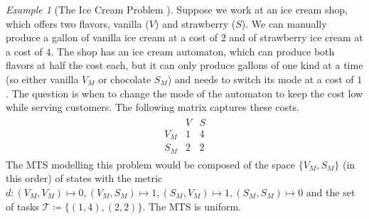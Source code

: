 \documentclass[10pt]{amsart}
\theoremstyle{definition}
\theoremstyle{remark}
\newtheorem{example}[theorem]{Example}
\begin{document}
    \begin{example}[The Ice Cream Problem {\cite[pp. 74-75]{Woeginger}}]
        Suppose we work at an ice cream shop, which offers two flavors, vanilla (\(V\)) and strawberry (\(S\)). We can manually produce a gallon of vanilla ice cream at a cost of \(2\) and of strawberry ice cream at a cost of \(4\). The shop has an ice cream automaton, which can produce both flavors at half the cost each, but it can only produce gallons of one kind at a time (so either vanilla \(V_M\) or chocolate \(S_M\)) and needs to switch its mode at a cost of \(1\). The question is when to change the mode of the automaton to keep the cost low while serving customers. The following matrix captures these costs.
        \begin{align*}
            \begin{array}{c|c|c}
                    & V & S\\\hline
                V_M & 1 & 4\\
                S_M & 2 & 2
            \end{array}
        \end{align*}
        The MTS modelling this problem would be composed of the space \(\{V_M, S_M\}\) (in this order) of states with the metric \(d\colon (V_M, V_M) \mapsto 0, (V_M, S_M) \mapsto 1, (S_M, V_M) \mapsto 1, (S_M, S_M) \mapsto 0\) and the set of tasks \(\mathcal{T} \coloneqq \{(1, 4), (2, 2)\}\). The MTS is uniform.
    \end{example}
\end{document}
